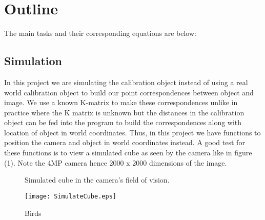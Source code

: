 \documentclass[titlepage]{article}
\begin{document}
\section{Outline}
The main tasks and their corresponding equations are below:
\subsection{Simulation}
In this project we are simulating the calibration object instead of using a real world calibration object to build our point correspondences between object and image. We use a known K-matrix to make these correspondences unlike in practice where the K matrix is unknown but the distances in the calibration object can be fed into the program to build the correspondences along with location of object in world coordinates. Thus, in this project we have functions to position the camera and object in world coordinates instead. A good test for these functions is to view a simulated cube as seen by the camera like in figure (1). Note the 4MP camera hence 2000 x 2000 dimensions of the image.
\begin{wrapfigure}{l}{4.5}
  \begin{center}
    \caption{Simulated cube in the camera's field of vision.}\label{wrap-fig:9}
    \texttt{[image: SimulateCube.eps]}
  \end{center}
  \caption{Birds}
\end{wrapfigure}
\end{document}
